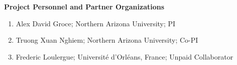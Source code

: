 \documentclass[11pt]{article}
\begin{document}

\begin{center}
  \large\bfseries
  Project Personnel and Partner Organizations
\end{center}

\begin{enumerate}
\item Alex David Groce; Northern Arizona University; PI
\item Truong Xuan Nghiem; Northern Arizona University; Co-PI
\item Frederic Loulergue; Universit\'{e} d'Orl\'{e}ans, France; Unpaid Collaborator %
\end{enumerate}
\end{document}
